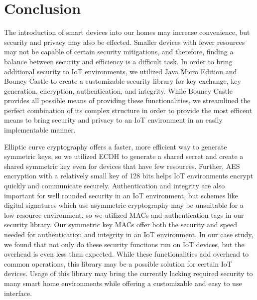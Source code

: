 \section{Conclusion}
The introduction of smart devices into our homes may increase convenience, but security and privacy may also be effected. 
Smaller devices with fewer resources may not be capable of certain security mitigations,
and therefore, finding a balance between security and efficiency is a difficult task. 
In order to bring additional security to IoT environments,
we utilized Java Micro Edition and Bouncy Castle to create a customizable security library for key exchange, key generation, encryption, authentication, and integrity. 
While Bouncy Castle provides all possible means of providing these functionalities,
we streamlined the perfect combination of its complex structure 
in order to provide the most efficent means to bring security and privacy to an IoT environment 
in an easily implementable manner. 

Elliptic curve cryptography offers a faster, more efficient way to generate symmetric keys, %
so we utilized ECDH to generate a shared secret and create a shared symmetric key even for devices that have few resources. 
Further, AES encryption with a relatively small key of 128 bits helps IoT environments encrypt quickly and communicate securely. 
Authentication and integrity are also important for well rounded security in an IoT environment,
but schemes like digital signatures which use asymmetric cryptography may be unsuitable for a low resource environment,
so we utilized MACs and authentication tags in our security library. 
Our symmetric key MACs offer both the security and speed needed for authentication and integrity in an IoT environment.  
In our case study, we found that not only do these security functions run on IoT devices, but the overhead is even less than expected. 
While these functionalities add overhead to common operations,
this library may be a possible solution for certain IoT devices. 
Usage of this library may bring the currently lacking required security to many smart home environments while offering a customizable and easy to use interface. 
